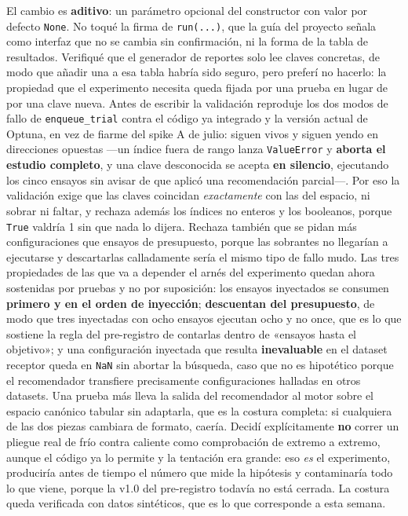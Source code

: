 \documentclass[11pt,letterpaper]{article}
\begin{document}
{El cambio es \textbf{aditivo}: un parámetro opcional del constructor con valor por defecto
 \texttt{None}. No toqué la firma de \texttt{run(...)}, que la guía del proyecto señala como
 interfaz que no se cambia sin confirmación, ni la forma de la tabla de resultados. Verifiqué
 que el generador de reportes solo lee claves concretas, de modo que añadir una a esa tabla
 habría sido seguro, pero preferí no hacerlo: la propiedad que el experimento necesita queda
 fijada por una prueba en lugar de por una clave nueva. Antes de escribir la validación
 reproduje los dos modos de fallo de \texttt{enqueue\_trial} contra el código ya integrado y
 la versión actual de Optuna, en vez de fiarme del spike A de julio: siguen vivos y siguen
 yendo en direcciones opuestas —un índice fuera de rango lanza \texttt{ValueError} y
 \textbf{aborta el estudio completo}, y una clave desconocida se acepta \textbf{en silencio},
 ejecutando los cinco ensayos sin avisar de que aplicó una recomendación parcial—. Por eso la
 validación exige que las claves coincidan \emph{exactamente} con las del espacio, ni sobrar
 ni faltar, y rechaza además los índices no enteros y los booleanos, porque \texttt{True}
 valdría 1 sin que nada lo dijera. Rechaza también que se pidan más configuraciones que
 ensayos de presupuesto, porque las sobrantes no llegarían a ejecutarse y descartarlas
 calladamente sería el mismo tipo de fallo mudo. Las tres propiedades de las que va a depender
 el arnés del experimento quedan ahora sostenidas por pruebas y no por suposición: los ensayos
 inyectados se consumen \textbf{primero y en el orden de inyección}; \textbf{descuentan del
 presupuesto}, de modo que tres inyectadas con ocho ensayos ejecutan ocho y no once, que es lo
 que sostiene la regla del pre-registro de contarlas dentro de «ensayos hasta el objetivo»; y
 una configuración inyectada que resulta \textbf{inevaluable} en el dataset receptor queda en
 \texttt{NaN} sin abortar la búsqueda, caso que no es hipotético porque el recomendador
 transfiere precisamente configuraciones halladas en otros datasets. Una prueba más lleva la
 salida del recomendador al motor sobre el espacio canónico tabular sin adaptarla, que es la
 costura completa: si cualquiera de las dos piezas cambiara de formato, caería. Decidí
 explícitamente \textbf{no} correr un pliegue real de frío contra caliente como comprobación
 de extremo a extremo, aunque el código ya lo permite y la tentación era grande: eso
 \emph{es} el experimento, produciría antes de tiempo el número que mide la hipótesis y
 contaminaría todo lo que viene, porque la v1.0 del pre-registro todavía no está cerrada. La
 costura queda verificada con datos sintéticos, que es lo que corresponde a esta semana.}
\end{document}

